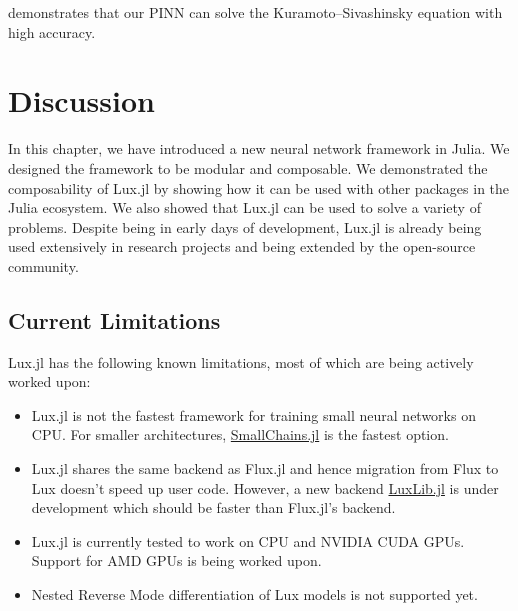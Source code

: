 \inputminted[linenos, breaklines, fontsize=\scriptsize, frame=single, framesep=10pt]{julia}{../code/pinn.jl}

 demonstrates that our PINN can solve the Kuramoto–Sivashinsky equation with high accuracy.

\section{Discussion}
\label{sec:discussion_lux}

In this chapter, we have introduced a new neural network framework in Julia. We designed the framework to be modular and composable. We demonstrated the composability of Lux.jl by showing how it can be used with other packages in the Julia ecosystem. We also showed that Lux.jl can be used to solve a variety of problems. Despite being in early days of development, Lux.jl is already being used extensively in research projects and being extended by the open-source community.

\subsection{Current Limitations}
\label{subsec:current_limitations}

Lux.jl has the following known limitations, most of which are being actively worked upon:
%
\begin{itemize}
  \item Lux.jl is not the fastest framework for training small neural networks on CPU. For smaller architectures, \href{https://github.com/PumasAI/SimpleChains.jl}{SmallChains.jl} is the fastest option.
  \item Lux.jl shares the same backend as Flux.jl and hence migration from Flux to Lux doesn't speed up user code. However, a new backend \href{https://github.com/LuxDL/LuxLib.jl}{LuxLib.jl} is under development which should be faster than Flux.jl's backend.
  \item Lux.jl is currently tested to work on CPU and NVIDIA CUDA GPUs. Support for AMD GPUs is being worked upon.
  \item Nested Reverse Mode differentiation of Lux models is not supported yet.
\end{itemize}
%
